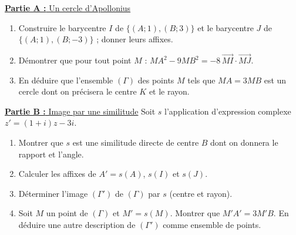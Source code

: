 \underline{\textbf{Partie A :} Un cercle d'Apollonius}
\begin{enumerate}
      \item Construire le barycentre $I$ de $\{(A ; 1), (B ; 3)\}$ et le barycentre $J$ de $\{(A ; 1), (B ; -3)\}$ ; donner leurs affixes.
      \item D\'emontrer que pour tout point $M$ : $MA^2 - 9MB^2 = -8\,\overrightarrow{MI} \cdot \overrightarrow{MJ}$.
      \item En d\'eduire que l'ensemble $(\Gamma)$ des points $M$ tels que $MA = 3MB$ est un cercle dont on pr\'ecisera le centre $K$ et le rayon.
\end{enumerate}
\underline{\textbf{Partie B :} Image par une similitude} \newline
Soit $s$ l'application d'expression complexe $z' = (1 + i)z - 3i$.
\begin{enumerate}
      \item Montrer que $s$ est une similitude directe de centre $B$ dont on donnera le rapport et l'angle.
      \item Calculer les affixes de $A' = s(A)$, $s(I)$ et $s(J)$.
      \item D\'eterminer l'image $(\Gamma')$ de $(\Gamma)$ par $s$ (centre et rayon).
      \item Soit $M$ un point de $(\Gamma)$ et $M' = s(M)$. Montrer que $M'A' = 3M'B$.
            En d\'eduire une autre description de $(\Gamma')$ comme ensemble de points.
\end{enumerate}

